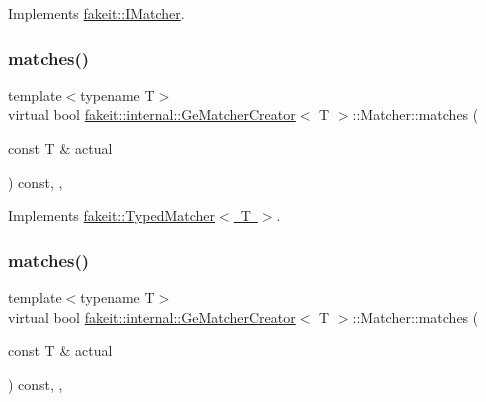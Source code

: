 Implements \mbox{\hyperlink{structfakeit_1_1IMatcher_a409d414a042236dc5e05e241dfd24a67}{fakeit\+::\+I\+Matcher}}.

\mbox{\label{structfakeit_1_1internal_1_1GeMatcherCreator_1_1Matcher_a5f89ea76a9474243dedbfc74bb1ba380}} 
\subsubsection{\texorpdfstring{matches()}{matches()}\hspace{0.1cm}{\footnotesize\ttfamily [1/9]}}
{\footnotesize\ttfamily template$<$typename T$>$ \\
virtual bool \mbox{\hyperlink{structfakeit_1_1internal_1_1GeMatcherCreator}{fakeit\+::internal\+::\+Ge\+Matcher\+Creator}}$<$ T $>$\+::Matcher\+::matches (\begin{DoxyParamCaption}\item[{const T \&}]{actual }\end{DoxyParamCaption}) const\hspace{0.3cm}{\ttfamily [inline]}, {\ttfamily [override]}, {\ttfamily [virtual]}}



Implements \mbox{\hyperlink{structfakeit_1_1TypedMatcher_ac553bb6ac7c98a489c92fa6ace0f2e2b}{fakeit\+::\+Typed\+Matcher$<$ T $>$}}.

\mbox{\label{structfakeit_1_1internal_1_1GeMatcherCreator_1_1Matcher_a5f89ea76a9474243dedbfc74bb1ba380}} 
\subsubsection{\texorpdfstring{matches()}{matches()}\hspace{0.1cm}{\footnotesize\ttfamily [2/9]}}
{\footnotesize\ttfamily template$<$typename T$>$ \\
virtual bool \mbox{\hyperlink{structfakeit_1_1internal_1_1GeMatcherCreator}{fakeit\+::internal\+::\+Ge\+Matcher\+Creator}}$<$ T $>$\+::Matcher\+::matches (\begin{DoxyParamCaption}\item[{const T \&}]{actual }\end{DoxyParamCaption}) const\hspace{0.3cm}{\ttfamily [inline]}, {\ttfamily [override]}, {\ttfamily [virtual]}}



